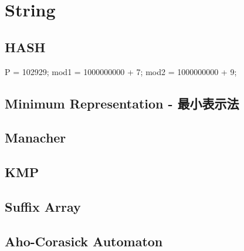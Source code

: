 \section{String}
	\subsection{HASH}
		P = 102929;
		mod1 = 1000000000 + 7;
		mod2 = 1000000000 + 9;
	\subsection{Minimum Representation - 最小表示法}
		
	\subsection{Manacher}
		
	\subsection{KMP}
		
	\subsection{Suffix Array}
		
	\subsection{Aho-Corasick Automaton}
		
		
